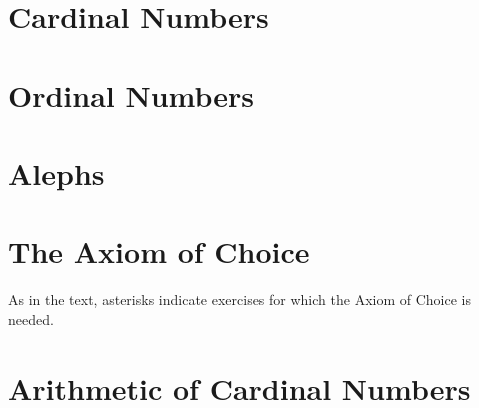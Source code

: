 \begin{questions}

\setcounter{section}{5-1}

\section{Cardinal Numbers}



\section{Ordinal Numbers}







\section{Alephs}



\section{The Axiom of Choice}
As in the text, asterisks indicate exercises for which the Axiom of Choice is needed.



\section{Arithmetic of Cardinal Numbers}


\end{questions}

